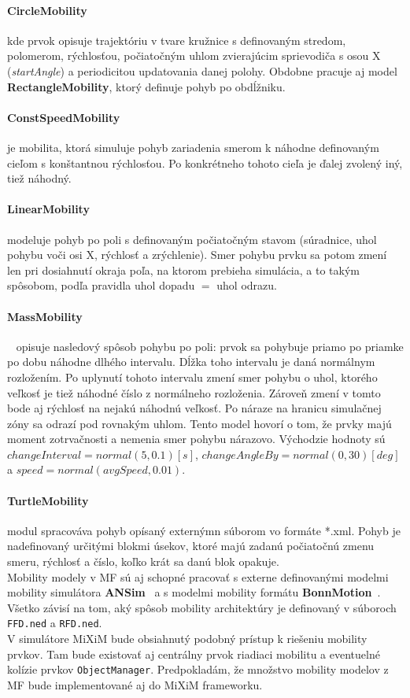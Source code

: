\paragraph{CircleMobility} kde prvok opisuje trajektóriu v tvare kružnice s definovaným stredom, polomerom, rýchlosťou, počiatočným uhlom zvierajúcim sprievodiča s osou X (\textit{startAngle}) a periodicitou updatovania danej polohy. Obdobne pracuje aj model \textbf{RectangleMobility}, ktorý definuje pohyb po obdĺžniku.
\paragraph{ConstSpeedMobility} je mobilita, ktorá simuluje pohyb zariadenia smerom k náhodne definovaným cieľom s konštantnou rýchlosťou. Po konkrétneho tohoto cieľa je ďalej zvolený iný, tiež náhodný.
\paragraph{LinearMobility} modeluje pohyb po poli s definovaným počiatočným stavom (súradnice, uhol pohybu voči osi X, rýchlosť a zrýchlenie). Smer pohybu prvku sa potom zmení len pri dosiahnutí okraja poľa, na ktorom prebieha simulácia, a to takým spôsobom, podľa pravidla uhol dopadu $=$ uhol odrazu.
\paragraph{MassMobility}~\cite{massmobility99} opisuje nasledový spôsob pohybu po poli: prvok sa pohybuje priamo po priamke po dobu náhodne dlhého intervalu. Dĺžka toho intervalu je daná normálnym rozložením. Po uplynutí tohoto intervalu zmení smer pohybu o uhol, ktorého veľkosť je tiež náhodné číslo z normálneho rozloženia. Zároveň zmení v tomto bode aj rýchlosť na nejakú náhodnú veľkosť. Po náraze na hranicu simulačnej zóny sa odrazí pod rovnakým uhlom. Tento model hovorí o tom, že prvky majú moment zotrvačnosti a nemenia smer pohybu nárazovo. Východzie hodnoty sú $changeInterval = normal(5, 0.1) [s]$, $changeAngleBy = normal(0, 30) [deg]$ a $speed = normal(avgSpeed, 0.01)$.
\paragraph{TurtleMobility} modul spracováva pohyb opísaný externýmn súborom vo formáte *.xml. Pohyb je nadefinovaný určitými blokmi úsekov, ktoré majú zadanú počiatočnú zmenu smeru, rýchlosť a číslo, koľko krát sa danú blok opakuje.\\
\indent\indent Mobility modely v MF sú aj schopné pracovať s externe definovanými modelmi mobility simulátora \textbf{ANSim}~\cite{ansim_homepage} a s modelmi mobility formátu \textbf{BonnMotion}~\cite{bonnmotion_homepage}. Všetko závisí na tom, aký spôsob mobility architektúry je definovaný v súboroch \texttt{FFD.ned} a \texttt{RFD.ned}.\\
\indent\indent V simulátore MiXiM bude obsiahnutý podobný prístup k riešeniu mobility prvkov. Tam bude existovať aj centrálny prvok riadiaci mobilitu a eventuelné kolízie prvkov \texttt{ObjectManager}. Predpokladám, že množstvo mobility modelov z MF bude implementované aj do MiXiM frameworku.\\

